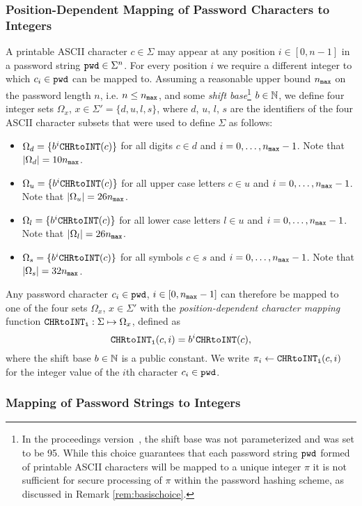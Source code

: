 \subsubsection{Position-Dependent Mapping of Password Characters to Integers}
A printable ASCII character $c\in\Sigma$ may appear at any position $i\in[0, n-1]$ in a password string $\mathtt{pwd}\in\Sigma^n$. For every position $i$ we require a different integer to which $c_i\in\mathtt{pwd}$ can be mapped to.
Assuming a reasonable upper bound ${n_\mathtt{max}}$ on the password length $n$, i.e. $n\leq {n_\mathtt{max}}$, and some \emph{shift base}\footnote{In the proceedings version~\cite{KieferM14b}, the shift base was not parameterized and was set to be 95. While this choice guarantees that each password string $\mathtt{pwd}$ formed of printable ASCII characters will be mapped to a unique integer $\pi$ it is not sufficient for secure processing of $\pi$ within the password hashing scheme, as discussed in Remark \ref{rem:basischoice}.} $b\in\mathbb{N}$, we define four integer sets $\Omega_x$, $x\in\Sigma' = \{d, u, l, s\}$, where $d$, $u$, $l$, $s$ are the identifiers of the four ASCII character subsets that were used to define $\Sigma$ as follows:
\begin{itemize}
	\item $\Omega_d = \{b^i\texttt{CHRtoINT}(c)\}$ for all digits $c\in d$ and $i=0,\ldots,{n_\mathtt{max}}-1$. Note that $|\Omega_d|= 10{n_\mathtt{max}}$.
	\item $\Omega_u = \{b^i\texttt{CHRtoINT}(c)\}$ for all upper case letters $c\in u$ and $i=0,\ldots,{n_\mathtt{max}}-1$. Note that $|\Omega_u|= 26{n_\mathtt{max}}$.
	\item $\Omega_l = \{b^i\texttt{CHRtoINT}(c)\}$ for all lower case letters $l\in u$ and $i=0,\ldots,{n_\mathtt{max}}-1$. Note that $|\Omega_l|= 26{n_\mathtt{max}}$.
	\item $\Omega_s = \{b^i\texttt{CHRtoINT}(c)\}$ for all symbols $c\in s$ and $i=0,\ldots,{n_\mathtt{max}}-1$. Note that $|\Omega_s|= 32{n_\mathtt{max}}$.
\end{itemize}
Any password character $c_i\in\mathtt{pwd}$, $i\in[0,{n_\mathtt{max}}-1]$ can therefore be mapped to one of the four sets $\Omega_x$, $x\in\Sigma'$ with the \emph{position-dependent character mapping} function $\texttt{CHRtoINT}_\texttt{i}:\Sigma\mapsto\Omega_{x}$, defined as
\[
\texttt{CHRtoINT}_\texttt{i}(c, i)= b^i\texttt{CHRtoINT}(c),
\]
where the shift base $b\in\mathbb{N}$ is a public constant.
We write $\pi_i \gets \texttt{CHRtoINT}_\texttt{i}(c, i)$ for the integer value of the $i$th character $c_i\in\mathtt{pwd}$.

\subsubsection{Mapping of Password Strings to Integers}


